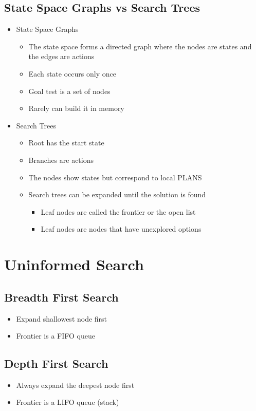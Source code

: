 \documentclass[11pt]{article}
\begin{document}
\subsection{State Space Graphs vs Search Trees}
\label{sec:orge69a0c8}
\begin{itemize}
\item State Space Graphs
\begin{itemize}
\item The state space forms a directed graph where the nodes are states and the edges are actions
\item Each state occurs only once
\item Goal test is a set of nodes
\item Rarely can build it in memory
\end{itemize}
\item Search Trees
\begin{itemize}
\item Root has the start state
\item Branches are actions
\item The nodes show states but correspond to local PLANS
\item Search trees can be expanded until the solution is found
\begin{itemize}
\item Leaf nodes are called the frontier or the open list
\item Leaf nodes are nodes that have unexplored options
\end{itemize}
\end{itemize}
\end{itemize}

\section{Uninformed Search}
\label{sec:orgbf5dc53}
\subsection{Breadth First Search}
\label{sec:orgd1b18ff}
\begin{itemize}
\item Expand shallowest node first
\item Frontier is a FIFO queue
\end{itemize}

\subsection{Depth First Search}
\label{sec:org5e33f20}
\begin{itemize}
\item Always expand the deepest node first
\item Frontier is a LIFO queue (stack)
\end{itemize}
\end{document}
